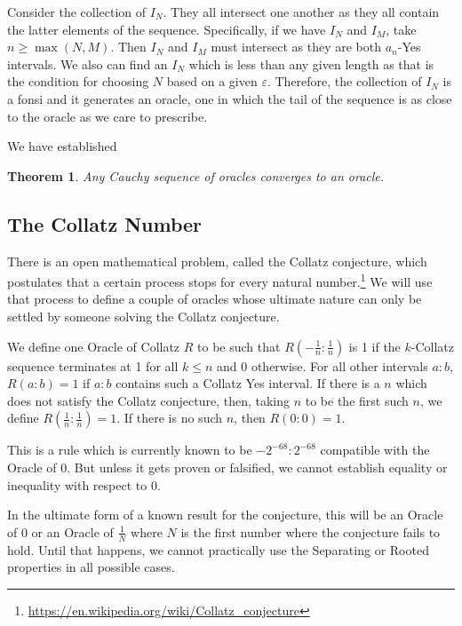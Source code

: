 \documentclass[12pt]{article}
\newtheorem{theorem}{Theorem}[subsection]
\theoremstyle{remark}
\begin{document}
Consider the collection of $I_N$. They all intersect one another as they all contain the latter elements of the sequence. Specifically, if we have $I_N$ and $I_M$, take $n \geq \max(N, M)$. Then $I_N$ and $I_M$ must intersect as they are both $a_n$-Yes intervals. We also can find an $I_N$ which is less than any given length as that is the condition for choosing $N$ based on a given $\varepsilon$. Therefore, the collection of $I_N$ is a fonsi and it generates an oracle, one in which the tail of the sequence is as close to the oracle as we care to prescribe. 

We have established

\begin{theorem}\label{th:cauchy}
Any Cauchy sequence of oracles converges to an oracle. 
\end{theorem}



\subsection{The Collatz Number}

There is an open mathematical problem, called the Collatz conjecture, which postulates that a certain process stops for every natural number.\footnote{\url{https://en.wikipedia.org/wiki/Collatz_conjecture}} We will use that process to define a couple of oracles whose ultimate nature can only be settled by someone solving the Collatz conjecture. 

We define one Oracle of Collatz $R$ to be such that $R(-\tfrac{1}{n}:\tfrac{1}{n})$ is 1 if the $k$-Collatz sequence terminates at 1 for all $k \leq n$ and 0 otherwise. For all other intervals $a:b$, $R(a:b) = 1$ if $a:b$ contains such a Collatz Yes interval. If there is a $n$ which does not satisfy the Collatz conjecture, then, taking $n$ to be the first such $n$, we define $R(\tfrac{1}{n}:\tfrac{1}{n}) = 1$. If there is no such $n$, then $R(0:0) = 1$.

This is a rule which is currently known to be $-2^{-68}:2^{-68}$ compatible with the Oracle of 0. But unless it gets proven or falsified, we cannot establish equality or inequality with respect to 0. 

In the ultimate form of a known result for the conjecture, this will be an Oracle of 0 or an Oracle of $\tfrac{1}{N}$ where $N$ is the first number where the conjecture fails to hold. Until that happens, we cannot practically use the Separating or Rooted properties in all possible cases. 
\end{document}
